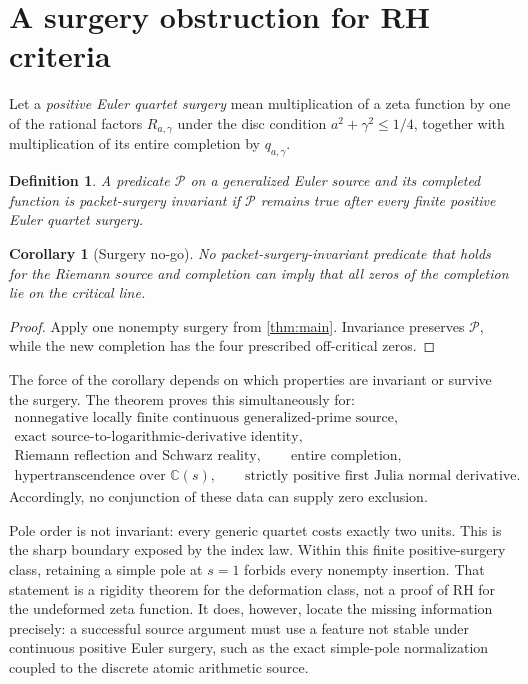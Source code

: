 \documentclass[11pt]{article}
\newtheorem{corollary}[theorem]{Corollary}
\newtheorem{definition}[theorem]{Definition}
\newcommand{\C}{\mathbb C}
\begin{document}
\section{A surgery obstruction for RH criteria}
\label{sec:nogo}

Let a \emph{positive Euler quartet surgery} mean multiplication of a
zeta function by one of the rational factors \(R_{a,\gamma}\) under the
disc condition \(a^2+\gamma^2\leq1/4\), together with multiplication of
its entire completion by \(q_{a,\gamma}\).

\begin{definition}
A predicate \(\mathcal P\) on a generalized Euler source and its completed
function is \emph{packet-surgery invariant} if
\(\mathcal P\) remains true after every finite positive Euler quartet
surgery.
\end{definition}

\begin{corollary}[Surgery no-go]
\label{cor:nogo}
No packet-surgery-invariant predicate that holds for the Riemann source
and completion can imply that all zeros of the completion lie on the
critical line.
\end{corollary}

\begin{proof}
Apply one nonempty surgery from \cref{thm:main}.  Invariance preserves
\(\mathcal P\), while the new completion has the four prescribed
off-critical zeros.
\end{proof}

The force of the corollary depends on which properties are invariant or
survive the surgery.  The theorem proves this simultaneously for:
\[
\begin{gathered}
\text{nonnegative locally finite continuous generalized-prime source},\\
\text{exact source-to-logarithmic-derivative identity},\\
\text{Riemann reflection and Schwarz reality},\qquad
\text{entire completion},\\
\text{hypertranscendence over }\C(s),\qquad
\text{strictly positive first Julia normal derivative}.
\end{gathered}
\]
Accordingly, no conjunction of these data can supply zero exclusion.

Pole order is not invariant: every generic quartet costs exactly two
units.  This is the sharp boundary exposed by the index law.  Within this
finite positive-surgery class, retaining a simple pole at \(s=1\) forbids
every nonempty insertion.  That statement is a rigidity theorem for the
deformation class, not a proof of RH for the undeformed zeta function.
It does, however, locate the missing information precisely: a successful
source argument must use a feature not stable under continuous positive
Euler surgery, such as the exact simple-pole normalization coupled to the
discrete atomic arithmetic source.
\end{document}

